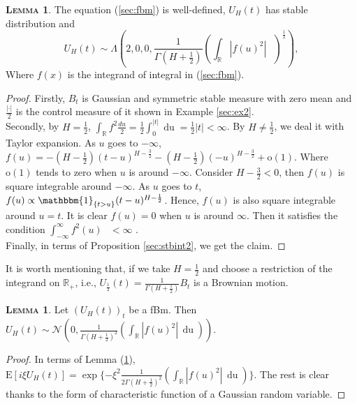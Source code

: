 \documentclass[a4paper, twoside, 11pt]{article}
\theoremstyle{definition}
\newtheorem{lemma}[definition]{\scshape Lemma}
\begin{document}
\begin{lemma}
  The equation (\ref{sec:fbm}) is well-defined, $U_H(t)$ has stable distribution and 
  \begin{equation*}
	U_H(t) \sim \Lambda(2, 0, 0, \frac{1}{\Gamma(H+\frac{1}{2})}(\int_{\mathbb{R}} |f(u)^2|\, \mathop{\frac{du}{2}})^\frac{1}{2}),
  \end{equation*}
  Where $f(x)$ is the integrand of integral in (\ref{sec:fbm}).
  \label{sec:l2}
\end{lemma}
\begin{proof}
  Firstly, $B_t$ is Gaussian and symmetric stable measure with zero mean and $\frac{|\cdot|}{2}$ is the control measure of it shown in Example \ref{sec:ex2}. \\
  Secondly, by $H=\frac{1}{2}$, $\int_{\mathbb{R}} f^2\frac{du}{2} = \frac{1}{2}\int_{0}^{|t|} \mathop{du} = \frac{1}{2}|t| < \infty$. By $H \neq \frac{1}{2}$, we deal it with Taylor expansion. As $u$ goes to $-\infty$, $f(u) = -(H-\frac{1}{2})(t-u)^{H-\frac{3}{2}}-(H-\frac{1}{2})(-u)^{H-\frac{3}{2}} + \mathrm{o}(1)$. Where $\mathrm{o}(1)$ tends to zero when $u$ is  around $-\infty$. Consider $H-\frac{3}{2} < 0$, then $f(u)$ is square integrable around $-\infty$. As $u$ goes to $t$, $f(u) \propto \mathbbm{1}_{\{t > u\}}(t-u)^{H-\frac{1}{2}}$. Hence, $f(u)$ is also square integrable around $u=t$. It is clear $f(u)=0$ when $u$ is around $\infty$. Then it satisfies the condition $\int_{-\infty}^{\infty}f^2(u)\,\mathop{\frac{du}{2}} < \infty$ .\\
  Finally, in terms of Proposition \ref{sec:stbint2}, we get the claim.
\end{proof}
It is worth mentioning that, if we take $H=\frac{1}{2}$ and choose a restriction of the integrand on $\mathbb{R}_+$, i.e., $U_{\frac{1}{2}}(t) = \frac{1}{\Gamma(H+\frac{1}{2})} B_t$ is a Brownian motion. 	
\begin{lemma}
  Let $(U_H(t))_t$ be a fBm. Then $U_H(t) \sim \mathcal{N}(0, \frac{1}{\Gamma(H+\frac{1}{2})^2}(\int_{\mathbb{R}} |f(u)^2|\, \mathop{du}))$.
  \label{sec:the1}
\end{lemma}
\begin{proof}
  In terms of Lemma (\ref{sec:l2}), $\mathrm{E}[i\xi U_H(t)] = \exp\{-\xi^2 \frac{1}{2\Gamma(H+\frac{1}{2})^2}(\int_{\mathbb{R}} |f(u)^2|\, \mathop{du})\}$. The rest is clear thanks to the form of characteristic function of a Gaussian random variable.
\end{proof}
\end{document}
